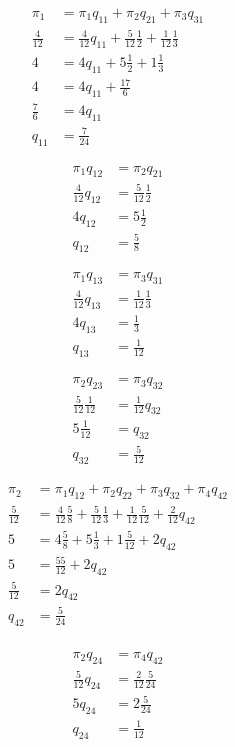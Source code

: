 \documentclass[12pt]{article}
\begin{document}
\begin{align*}
	\pi_1 &= \pi_1 q_{11} + \pi_2 q_{21} + \pi_3 q_{31} \\
	\frac{4}{12} &= \frac{4}{12} q_{11} + \frac{5}{12} \frac{1}{2} + \frac{1}{12} \frac{1}{3} \\
	4 &= 4 q_{11} + 5 \frac{1}{2} + 1 \frac{1}{3} \\
	4 &= 4 q_{11} + \frac{17}{6} \\
	\frac{7}{6} &= 4 q_{11} \\
	q_{11} &= \frac{7}{24}
\end{align*}

\begin{align*}
	\pi_1 q_{12} &= \pi_2 q_{21} \\
	\frac{4}{12} q_{12} &= \frac{5}{12} \frac{1}{2} \\
	4 q_{12} &= 5 \frac{1}{2} \\
	q_{12} &= \frac{5}{8}
\end{align*}

\begin{align*}
	\pi_1 q_{13} &= \pi_3 q_{31} \\
	\frac{4}{12} q_{13} &= \frac{1}{12} \frac{1}{3} \\
	4 q_{13} &= \frac{1}{3} \\
	q_{13} &= \frac{1}{12}
\end{align*}

\begin{align*}
	\pi_2 q_{23} &= \pi_3 q_{32} \\
	\frac{5}{12} \frac{1}{12} &= \frac{1}{12} q_{32} \\
	5 \frac{1}{12} &= q_{32} \\
	q_{32} &= \frac{5}{12}
\end{align*}

\begin{align*}
	\pi_2 &= \pi_1 q_{12} + \pi_2 q_{22} + \pi_3 q_{32} + \pi_4 q_{42} \\
	\frac{5}{12} &= \frac{4}{12} \frac{5}{8} + \frac{5}{12} \frac{1}{3} + \frac{1}{12} \frac{5}{12} + \frac{2}{12} q_{42} \\
	5 &= 4 \frac{5}{8} + 5 \frac{1}{3} + 1 \frac{5}{12} + 2 q_{42} \\
	5 &= \frac{55}{12} + 2 q_{42} \\
	\frac{5}{12} &= 2 q_{42} \\
	q_{42} &= \frac{5}{24}  \\
\end{align*}

\begin{align*}
	\pi_2 q_{24} &= \pi_4 q_{42} \\
	\frac{5}{12} q_{24} &= \frac{2}{12} \frac{5}{24} \\
	5 q_{24} &= 2 \frac{5}{24} \\
	q_{24} &= \frac{1}{12}
\end{align*}
\end{document}
